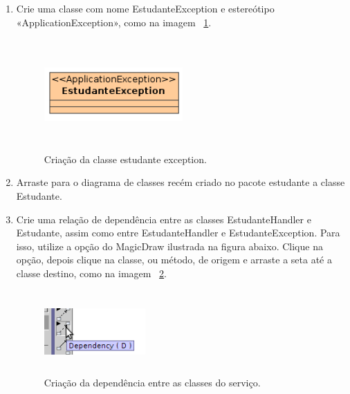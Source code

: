 \begin{enumerate}
\item Crie uma classe com nome EstudanteException e estereótipo
«ApplicationException», como na imagem ~\ref{cria_estudante_exception}.
\begin{figure}[H]
	\centering
	\includegraphics[width=150pt,height=120pt]{imgs/tutorial-mdarte-0010.png}
	\caption{Criação da classe estudante exception.}
	\label{cria_estudante_exception}
\end{figure}
	
\item Arraste para o diagrama de classes recém criado no pacote estudante a classe Estudante.
	
\item Crie uma relação de dependência entre as classes EstudanteHandler e
Estudante, assim como entre EstudanteHandler e EstudanteException. Para isso,
utilize a opção do MagicDraw ilustrada na figura abaixo. Clique na opção, depois
clique na classe, ou método, de origem e arraste a seta até a classe destino,
como na imagem ~\ref{cria_dependencia_servico}.

\begin{figure}[H]
	\centering
	\includegraphics[width=110pt,height=90pt]{imgs/tutorial-mdarte-0012.png}
	\caption{Criação da dependência entre as classes do serviço.}
	\label{cria_dependencia_servico}
\end{figure}


\end{enumerate}
